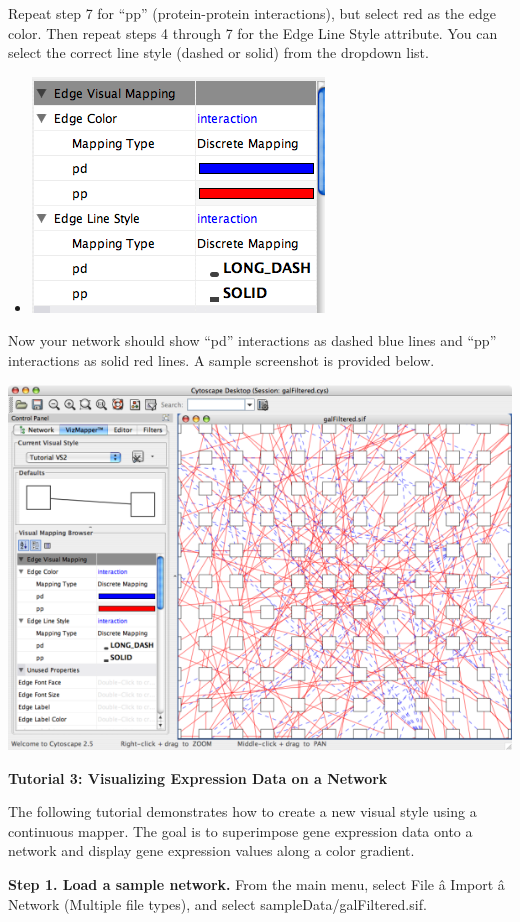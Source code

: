  Repeat step 7 for ``pp'' (protein-protein interactions), but select red as the edge color. Then repeat steps 4 through 7 for the Edge Line Style attribute. You can select the correct line style (dashed or solid) from the dropdown list. 
\begin{itemize}
\item 

 \includegraphics[width=.6\textwidth]{images/EdgeMapping3.png} 


\end{itemize}


 Now your network should show ``pd'' interactions as dashed blue lines and ``pp'' interactions as solid red lines. A sample screenshot is provided below. 


 \includegraphics[width=.6\textwidth]{images/NewVizMapperInteractionsRedBlue.png} 


 
\textbf{Tutorial 3: Visualizing Expression Data on a Network}


 The following tutorial demonstrates how to create a new visual style using a continuous mapper. The goal is to superimpose gene expression data onto a network and display gene expression values along a color gradient. 


 \textbf{Step 1. Load a sample network.}
 From the main menu, select File \^a Import \^a Network (Multiple file types), and select sampleData/galFiltered.sif. 


